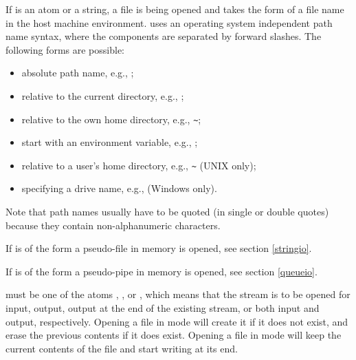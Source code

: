 If  is an atom or a string, a file is being opened
and  takes
the form of a file name in the host machine environment.
{\eclipse} uses an operating
system independent path name syntax, where the components are separated by
forward slashes.
The following forms are possible:
\begin{itemize}
\item absolute path name, e.g., ;
\item relative to the current directory, e.g., ;
\item relative to the own home directory, e.g.,
       \verb:~:;
\item start with an environment variable, e.g.,
      ;
\item relative to a user's home directory, e.g.,
       \verb:~: (UNIX only);
\item specifying a drive name, e.g., 
       (Windows only).
\end{itemize}
Note that path names usually have to be quoted (in single or double quotes)
because they contain non-alphanumeric characters.

If  is of the form  a
    pseudo-file
in memory is opened, see section \ref{stringio}.

If  is of the form  a
pseudo-pipe in memory is opened, see section \ref{queueio}.

 must be one of the atoms , ,
 or ,
which means that the stream is to be opened for input, output, output at the
end of the existing stream, or both input and output, respectively.
Opening a file in  mode will create it if it does not exist,
and erase the previous contents if it does exist.
Opening a file in  mode will keep the current contents
of the file and start writing at its end.

